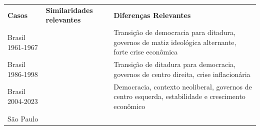 \begin{longtable}[]{@{}
  >{\raggedright\arraybackslash}p{}
  >{\raggedright\arraybackslash}p{}
  >{\raggedright\arraybackslash}p{}@{}}
\toprule\noalign{}
\begin{minipage}[b]{\linewidth}\raggedright
\textbf{Casos}
\end{minipage} & \begin{minipage}[b]{\linewidth}\raggedright
\textbf{Similaridades relevantes}
\end{minipage} & \begin{minipage}[b]{\linewidth}\raggedright
\textbf{Diferenças Relevantes}
\end{minipage} \\
\begin{minipage}[b]{\linewidth}\raggedright
Brasil 1961-1967
\end{minipage} &
\multirow{3}{=}{\begin{minipage}[b]{\linewidth}\raggedright
Desindustrialização
\end{minipage}} & \begin{minipage}[b]{\linewidth}\raggedright
Transição de democracia para ditadura, governos de matiz ideológica
alternante, forte crise econômica
\end{minipage} \\
\begin{minipage}[b]{\linewidth}\raggedright
Brasil 1986-1998
\end{minipage} & & \begin{minipage}[b]{\linewidth}\raggedright
Transição de ditadura para democracia, governos de centro direita, crise
inflacionária
\end{minipage} \\
\begin{minipage}[b]{\linewidth}\raggedright
Brasil 2004-2023
\end{minipage} & & \begin{minipage}[b]{\linewidth}\raggedright
Democracia, contexto neoliberal, governos de centro esquerda,
estabilidade e crescimento econômico
\end{minipage} \\
\begin{minipage}[b]{\linewidth}\raggedright
São Paulo
\end{minipage} &
\multirow{2}{=}{\begin{minipage}[b]{\linewidth}\raggedright

\end{minipage}}
\end{longtable}
